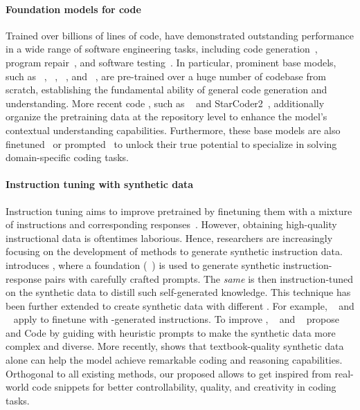 \paragraph{Foundation models for code}

Trained over billions of lines of code,  have demonstrated outstanding performance in a wide range of software engineering tasks, including code generation~\cite{codex, synthesisllm}, program repair~\cite{alpharepair, wei2023copiloting, aprstudy, aprstudy2, bouzenia2024repairagent}, and software testing~\cite{fuzz4all, titanfuzz, yuan2023no, schafer2023empirical, lemieux2023codamosa}.
In particular, prominent base models, such as \codegen{}~\cite{codegen}, \codetf~\cite{codet5}, \starcoder{}~\cite{starcoder}, and \codellama{}~\cite{codellama}, are pre-trained over a huge number of codebase from scratch, establishing the fundamental ability of general code generation and understanding.
More recent code , such as \dscoder{}~\cite{dscoder} and StarCoder2~\cite{starcoder2}, additionally organize the pretraining data at the repository level to enhance the model's contextual understanding capabilities.
Furthermore, these base models are also finetuned~\cite{wizardcoder} or prompted~\cite{selfdebug} to unlock their true potential to specialize in solving domain-specific coding tasks.

\paragraph{Instruction tuning with synthetic data}
Instruction tuning aims to improve
pretrained  by finetuning them with a mixture of instructions and corresponding responses~\cite{wei2022finetuned}.
However, obtaining high-quality instructional data
{is oftentimes laborious}.
Hence, researchers are increasingly focusing on the development of methods to generate synthetic instruction data.
\citet{selfinstruct} introduces \emph{\selfinstruct{}}, where a foundation \llm{} (\gptthree~\cite{gpt3}) is used to generate synthetic instruction-response pairs with carefully crafted prompts. The \emph{same} \llm{} is then instruction-tuned on the synthetic data to distill such self-generated knowledge.
{
This technique has been further extended to create synthetic data with different }.
For example, \alpaca{}~\cite{alpaca} and \codealpaca{}~\cite{codealpaca} apply \selfinstruct{} to finetune \llama{} with \chatgpt-generated instructions. 
To improve \selfinstruct{}, \wizardlm~\cite{xu2023wizardlm} and \wizardcoder~\cite{luo2023wizardcoder} propose \evolinstruct{} and Code \evolinstruct{} by guiding \chatgpt{} with heuristic prompts to make the synthetic data more complex and diverse.
More recently, \citet{phi} shows that textbook-quality synthetic data alone can help the model achieve remarkable coding and reasoning capabilities.
Orthogonal to all existing methods, our proposed \tech{} allows  to get inspired from real-world code snippets for better controllability, quality, and creativity in coding tasks.

